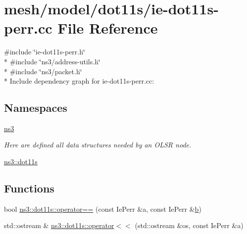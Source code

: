 \hypertarget{ie-dot11s-perr_8cc}{}\section{mesh/model/dot11s/ie-\/dot11s-\/perr.cc File Reference}
\label{ie-dot11s-perr_8cc}
{\ttfamily \#include \char`\"{}ie-\/dot11s-\/perr.\+h\char`\"{}}\\*
{\ttfamily \#include \char`\"{}ns3/address-\/utils.\+h\char`\"{}}\\*
{\ttfamily \#include \char`\"{}ns3/packet.\+h\char`\"{}}\\*
Include dependency graph for ie-\/dot11s-\/perr.cc\+:
\subsection*{Namespaces}
\begin{DoxyCompactItemize}
\item 
 \hyperlink{namespacens3}{ns3}
\begin{DoxyCompactList}\small\item\em Here are defined all data structures needed by an O\+L\+SR node. \end{DoxyCompactList}\item 
 \hyperlink{namespacens3_1_1dot11s}{ns3\+::dot11s}
\end{DoxyCompactItemize}
\subsection*{Functions}
\begin{DoxyCompactItemize}
\item 
bool \hyperlink{namespacens3_1_1dot11s_ad65ce7ffbc9dd8e7ba1d8771fca1bc55}{ns3\+::dot11s\+::operator==} (const Ie\+Perr \&a, const Ie\+Perr \&\hyperlink{lte__pathloss_8m_a21ad0bd836b90d08f4cf640b4c298e7c}{b})
\item 
std\+::ostream \& \hyperlink{namespacens3_1_1dot11s_a28e70b28570f80f59f0531d995b2cc0c}{ns3\+::dot11s\+::operator$<$$<$} (std\+::ostream \&os, const Ie\+Perr \&a)
\end{DoxyCompactItemize}
